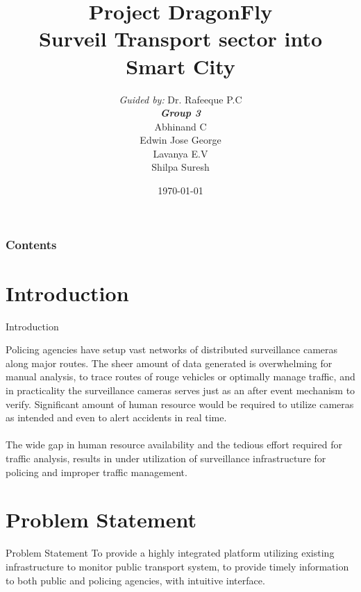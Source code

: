 \documentclass{beamer}
\title[DragonFly]{Project DragonFly \\ Surveil Transport sector into Smart City}
\author[Group 3]{
	{\small \textit{Guided by:}} Dr. Rafeeque P.C \\
	\medskip
	{\small \textbf{\textit{Group 3}}} \\
	Abhinand C \\
	Edwin Jose George \\
	Lavanya E.V \\
	Shilpa Suresh
}
\institute[GCEK]{Government College of Engineering Kannur}
\date{\today}
\begin{document}
\begin{frame}
\titlepage
\end{frame}

\begin{frame}
\frametitle{Contents}
\tableofcontents
\end{frame}


\section{Introduction}
\begin{frame}{Introduction}
	
    Policing agencies have setup vast networks of distributed surveillance cameras along major routes. The sheer amount of data generated is overwhelming for manual analysis, to trace routes of rouge vehicles or optimally manage traffic, and in practicality the surveillance cameras serves just as an after event mechanism to verify. Significant amount of human resource would be required to utilize cameras as intended and even to alert accidents in real time. \\~\\
    
    The wide gap in human resource availability and the tedious effort required for traffic analysis, results in under utilization of surveillance infrastructure for policing and improper traffic management.
    
\end{frame}
\section{Problem Statement}
\begin{frame}{Problem Statement}
	To provide a highly integrated platform utilizing existing infrastructure to monitor public transport system, to provide timely information to both public and policing agencies, with intuitive interface.
\end{frame}
\end{document}
